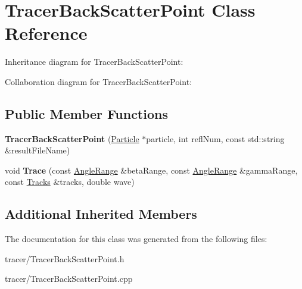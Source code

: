 \hypertarget{class_tracer_back_scatter_point}{}\section{Tracer\+Back\+Scatter\+Point Class Reference}
\label{class_tracer_back_scatter_point}


Inheritance diagram for Tracer\+Back\+Scatter\+Point\+:


Collaboration diagram for Tracer\+Back\+Scatter\+Point\+:
\subsection*{Public Member Functions}
\begin{DoxyCompactItemize}
\item 
\mbox{\label{class_tracer_back_scatter_point_a19a45ca1758bc87861b28bec20b9c9eb}} 
{\bfseries Tracer\+Back\+Scatter\+Point} (\mbox{\hyperlink{class_particle}{Particle}} $\ast$particle, int refl\+Num, const std\+::string \&result\+File\+Name)
\item 
\mbox{\label{class_tracer_back_scatter_point_a2db2b1225db5a2cc6e4e8cd436e49ac9}} 
void {\bfseries Trace} (const \mbox{\hyperlink{struct_angle_range}{Angle\+Range}} \&beta\+Range, const \mbox{\hyperlink{struct_angle_range}{Angle\+Range}} \&gamma\+Range, const \mbox{\hyperlink{class_tracks}{Tracks}} \&tracks, double wave)
\end{DoxyCompactItemize}
\subsection*{Additional Inherited Members}


The documentation for this class was generated from the following files\+:\begin{DoxyCompactItemize}
\item 
tracer/Tracer\+Back\+Scatter\+Point.\+h\item 
tracer/Tracer\+Back\+Scatter\+Point.\+cpp\end{DoxyCompactItemize}

